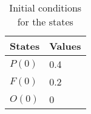 \begin{table}
	\centering
	\begin{tabular}{ll}
		\toprule
			\textbf{States} & \textbf{Values}
            \\
        \midrule
            $P(0)$ & 0.4
            \\
        	$F(0)$ & 0.2
			\\
            $O(0)$ & 0
            \\
		\bottomrule
    \end{tabular}
	\caption{Initial conditions for the states}
\end{table}
